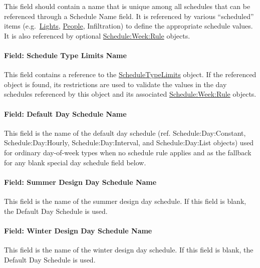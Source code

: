 This field should contain a name that is unique among all schedules that can be referenced through a Schedule Name field.
It is referenced by various ``scheduled'' items (e.g.~\hyperref[lights-000]{Lights}, \hyperref[people]{People}, Infiltration) to define the appropriate schedule values.
It is also referenced by optional \hyperref[scheduleweekrule]{Schedule:Week:Rule} objects.

\paragraph{Field: Schedule Type Limits Name}\label{field-schedule-type-limits-name-scheduleyearrules}

This field contains a reference to the \hyperref[scheduletypelimits]{ScheduleTypeLimits} object.
If the referenced object is found, its restrictions are used to validate the values in the day schedules referenced by this object and its associated \hyperref[scheduleweekrule]{Schedule:Week:Rule} objects.

\paragraph{Field: Default Day Schedule Name}\label{field-default-day-schedule-name-scheduleyearrules}

This field is the name of the default day schedule (ref. Schedule:Day:Constant, Schedule:Day:Hourly, Schedule:Day:Interval, and Schedule:Day:List objects) used for ordinary day-of-week types when no schedule rule applies and as the fallback for any blank special day schedule field below.

\paragraph{Field: Summer Design Day Schedule Name}\label{field-summer-design-day-schedule-name-scheduleyearrules}

This field is the name of the summer design day schedule. If this field is blank, the Default Day Schedule is used.

\paragraph{Field: Winter Design Day Schedule Name}\label{field-winter-design-day-schedule-name-scheduleyearrules}

This field is the name of the winter design day schedule. If this field is blank, the Default Day Schedule is used.

